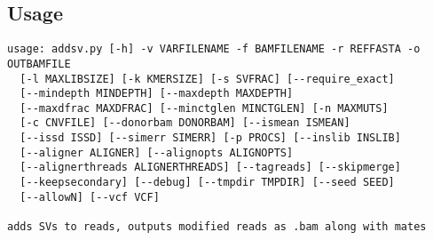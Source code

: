 \documentclass[letterpaper,11pt]{article}
\begin{document}
\subsection{Usage}
\begin{verbatim}
usage: addsv.py [-h] -v VARFILENAME -f BAMFILENAME -r REFFASTA -o OUTBAMFILE
  [-l MAXLIBSIZE] [-k KMERSIZE] [-s SVFRAC] [--require_exact]
  [--mindepth MINDEPTH] [--maxdepth MAXDEPTH]
  [--maxdfrac MAXDFRAC] [--minctglen MINCTGLEN] [-n MAXMUTS]
  [-c CNVFILE] [--donorbam DONORBAM] [--ismean ISMEAN]
  [--issd ISSD] [--simerr SIMERR] [-p PROCS] [--inslib INSLIB]
  [--aligner ALIGNER] [--alignopts ALIGNOPTS]
  [--alignerthreads ALIGNERTHREADS] [--tagreads] [--skipmerge]
  [--keepsecondary] [--debug] [--tmpdir TMPDIR] [--seed SEED]
  [--allowN] [--vcf VCF]

adds SVs to reads, outputs modified reads as .bam along with mates


\end{verbatim}
\end{document}
